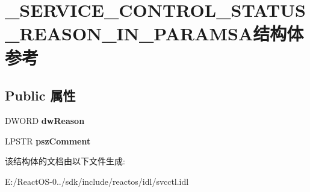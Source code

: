 \hypertarget{struct___s_e_r_v_i_c_e___c_o_n_t_r_o_l___s_t_a_t_u_s___r_e_a_s_o_n___i_n___p_a_r_a_m_s_a}{}\section{\+\_\+\+S\+E\+R\+V\+I\+C\+E\+\_\+\+C\+O\+N\+T\+R\+O\+L\+\_\+\+S\+T\+A\+T\+U\+S\+\_\+\+R\+E\+A\+S\+O\+N\+\_\+\+I\+N\+\_\+\+P\+A\+R\+A\+M\+S\+A结构体 参考}
\label{struct___s_e_r_v_i_c_e___c_o_n_t_r_o_l___s_t_a_t_u_s___r_e_a_s_o_n___i_n___p_a_r_a_m_s_a}
\subsection*{Public 属性}
\begin{DoxyCompactItemize}
\item 
\mbox{\label{struct___s_e_r_v_i_c_e___c_o_n_t_r_o_l___s_t_a_t_u_s___r_e_a_s_o_n___i_n___p_a_r_a_m_s_a_a101d1db95d211d5e7ffca09d25b06e81}} 
D\+W\+O\+RD {\bfseries dw\+Reason}
\item 
\mbox{\label{struct___s_e_r_v_i_c_e___c_o_n_t_r_o_l___s_t_a_t_u_s___r_e_a_s_o_n___i_n___p_a_r_a_m_s_a_a7e80941a7a4481a728ae0f365984eef6}} 
L\+P\+S\+TR {\bfseries psz\+Comment}
\end{DoxyCompactItemize}


该结构体的文档由以下文件生成\+:\begin{DoxyCompactItemize}
\item 
E\+:/\+React\+O\+S-\/0../sdk/include/reactos/idl/svcctl.\+idl\end{DoxyCompactItemize}
